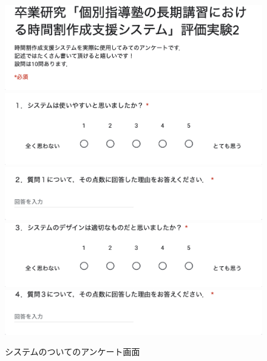 \begin{figure}[htbp]
\begin{center}
\includegraphics[scale=0.5]{image/questionB/b1.eps}
\includegraphics[scale=0.5]{image/questionB/b2.eps}
\includegraphics[scale=0.5]{image/questionB/b3.eps}
\includegraphics[scale=0.5]{image/questionB/b4.eps}
\includegraphics[scale=0.5]{image/questionB/b5.eps}
\caption{システムのついてのアンケート画面}
\label{A4}
\end{center}
\end{figure}

